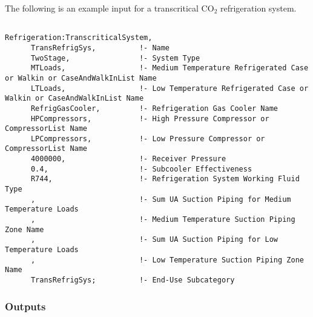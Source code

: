 The following is an example input for a transcritical CO\(_{2}\) refrigeration system.

\begin{lstlisting}

Refrigeration:TranscriticalSystem,
      TransRefrigSys,          !- Name
      TwoStage,                !- System Type
      MTLoads,                 !- Medium Temperature Refrigerated Case or Walkin or CaseAndWalkInList Name
      LTLoads,                 !- Low Temperature Refrigerated Case or Walkin or CaseAndWalkInList Name
      RefrigGasCooler,         !- Refrigeration Gas Cooler Name
      HPCompressors,           !- High Pressure Compressor or CompressorList Name
      LPCompressors,           !- Low Pressure Compressor or CompressorList Name
      4000000,                 !- Receiver Pressure
      0.4,                     !- Subcooler Effectiveness
      R744,                    !- Refrigeration System Working Fluid Type
      ,                        !- Sum UA Suction Piping for Medium Temperature Loads
      ,                        !- Medium Temperature Suction Piping Zone Name
      ,                        !- Sum UA Suction Piping for Low Temperature Loads
      ,                        !- Low Temperature Suction Piping Zone Name
      TransRefrigSys;          !- End-Use Subcategory
\end{lstlisting}

\subsubsection{Outputs}\label{outputs-3-016}

